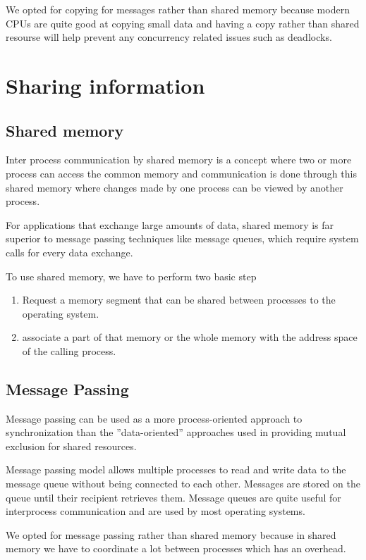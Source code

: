 \documentclass[12pt]{report}
\begin{document}
	We opted for copying for messages rather than shared memory because
	modern CPUs are quite good at copying small data and having a copy rather than
	shared resourse will help prevent any concurrency related issues such as deadlocks.	

    \section{Sharing information}
    \subsection{Shared memory}
    Inter process communication by shared memory is a concept where two or
    more process can access the common memory and communication is done
    through this shared memory where changes made by one process can be
    viewed by another process.

    For applications that exchange large amounts of data, shared memory is
    far superior to message passing techniques like message queues, which require
    system calls for every data exchange.

    To use shared memory, we have to perform two basic step
    \begin{enumerate}
		\item Request a memory segment that can be shared between processes to the operating system.		
        \item associate a part of that memory or the whole memory with the address space of the calling process.
	\end{enumerate}
    
    \subsection{Message Passing}
    Message passing can be used as a more process-oriented approach to synchronization 
    than the ”data-oriented” approaches used in providing mutual
    exclusion for shared resources.

    Message passing model allows multiple processes to read and write data
    to the message queue without being connected to each other. Messages are
    stored on the queue until their recipient retrieves them. Message queues are
    quite useful for interprocess communication and are used by most operating
    systems.

    We opted for message passing rather than shared memory because in
    shared memory we have to coordinate a lot between processes which has an
    overhead.
\end{document}
